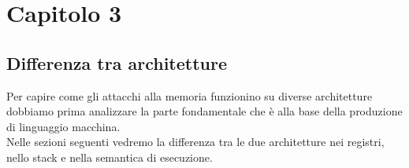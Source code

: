 \chapter*{Capitolo 3}

\section*{Differenza tra architetture}
Per capire come gli attacchi alla memoria funzionino su diverse architetture dobbiamo prima analizzare la parte fondamentale che è alla base della produzione di linguaggio macchina.\\
Nelle sezioni seguenti vedremo la differenza tra le due architetture nei registri, nello stack e nella semantica di esecuzione.
